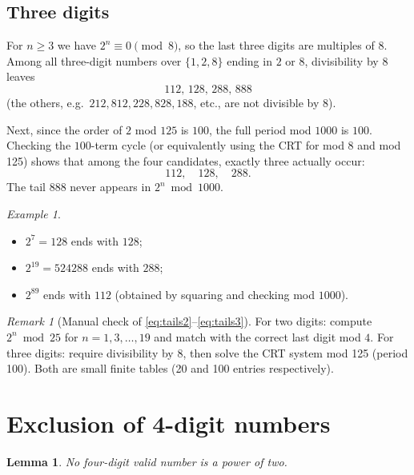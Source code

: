 \documentclass[12pt]{article}
\theoremstyle{plain}
\newtheorem{lemma}{Lemma}
\theoremstyle{remark}
\newtheorem*{remark}{Remark}
\newtheorem*{example}{Example}
\begin{document}
\subsection*{Three digits}
For $n\ge3$ we have $2^n\equiv0\pmod8$, so the last three digits are multiples of 8.  
Among all three-digit numbers over $\{1,2,8\}$ ending in $2$ or $8$, divisibility by $8$ leaves
\[
112,\,128,\,288,\,888
\]
(the others, e.g.\ $212,812,228,828,188$, etc., are not divisible by 8).

Next, since the order of $2$ mod $125$ is $100$, the full period mod $1000$ is $100$.  
Checking the $100$-term cycle (or equivalently using the CRT for mod 8 and mod 125) shows that among the four candidates, exactly three actually occur:
\begin{equation}\label{eq:tails3}
\boxed{112,\quad 128,\quad 288.}
\end{equation}
The tail $888$ never appears in $2^n\bmod1000$.

\begin{example}
\begin{itemize}[nosep]
\item $2^7=128$ ends with $128$;
\item $2^{19}=524288$ ends with $288$;
\item $2^{89}$ ends with $112$ (obtained by squaring and checking mod $1000$).
\end{itemize}
\end{example}

\begin{remark}[Manual check of \eqref{eq:tails2}–\eqref{eq:tails3}]
For two digits: compute $2^n\bmod25$ for $n=1,3,\ldots,19$ and match with the correct last digit mod $4$.  
For three digits: require divisibility by 8, then solve the CRT system mod 125 (period 100).  
Both are small finite tables (20 and 100 entries respectively).
\end{remark}

\section{Exclusion of 4-digit numbers}
\begin{lemma}\label{lem:len4}
No four-digit valid number is a power of two.
\end{lemma}
\end{document}
